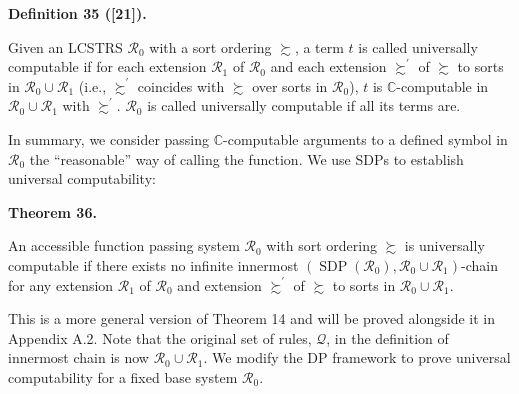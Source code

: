  
 
\par\medskip\noindent\textbf{Definition 35 ([21]).}\par
 
 
Given an LCSTRS $\mathcal{R}_{0}$ with a sort ordering $\succsim$, a term $t$ is called universally computable if for each extension $\mathcal{R}_{1}$ of $\mathcal{R}_{0}$ and each extension $\succsim^{\prime}$ of $\succsim$ to sorts in $\mathcal{R}_{0}\cup\mathcal{R}_{1}$ (i.e., $\succsim^{\prime}$ coincides with $\succsim$ over sorts in $\mathcal{R}_{0}$), $t$ is $\mathbb{C}$-computable in $\mathcal{R}_{0}\cup\mathcal{R}_{1}$ with $\succsim^{\prime}$. $\mathcal{R}_{0}$ is called universally computable if all its terms are.\par
 
 
 
 
In summary, we consider passing $\mathbb{C}$-computable arguments to a defined symbol in $\mathcal{R}_{0}$ the “reasonable” way of calling the function. We use SDPs to establish universal computability:\par
 
 
 
\par\medskip\noindent\textbf{Theorem 36.}\par
 
 
An accessible function passing system $\mathcal{R}_{0}$ with sort ordering $\succsim$ is universally computable if there exists no infinite innermost $(\operatorname{SDP}(\mathcal{R}_{0}),\mathcal{R}_{0}\cup\mathcal{R}_{1})$-chain for any extension $\mathcal{R}_{1}$ of $\mathcal{R}_{0}$ and extension $\succsim^{\prime}$ of $\succsim$ to sorts in $\mathcal{R}_{0}\cup\mathcal{R}_{1}$.\par
 
 
 
 
This is a more general version of Theorem 14 and will be proved alongside it in Appendix A.2. Note that the original set of rules, $\mathcal{Q}$, in the definition of innermost chain is now $\mathcal{R}_{0}\cup\mathcal{R}_{1}$. We modify the DP framework to prove universal computability for a fixed base system $\mathcal{R}_{0}$.\par
 

